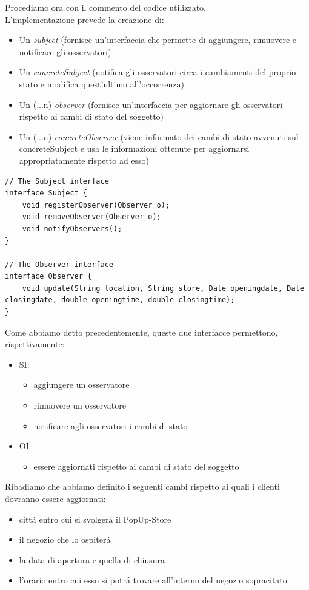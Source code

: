 \documentclass[12pt]{article}
\begin{document}
Procediamo ora con il commento del codice utilizzato. \\
L'implementazione prevede la creazione di:
\begin{itemize}
    \item Un \textit{subject} (fornisce un'interfaccia che permette di aggiungere, rimuovere e notificare gli osservatori)
    \item Un \textit{concreteSubject} (notifica gli osservatori circa i cambiamenti del proprio stato e modifica quest'ultimo all'occorrenza)
    \item Un (...n) \textit{observer} (fornisce un'interfaccia per aggiornare gli osservatori rispetto ai cambi di stato del soggetto)
    \item Un (...n) \textit{concreteObserver} (viene informato dei cambi di stato avvenuti sul concreteSubject e usa le informazioni ottenute per aggiornarsi appropriatamente rispetto ad esso)
\end{itemize}

\begin{lstlisting}
// The Subject interface 
interface Subject {
    void registerObserver(Observer o); 
    void removeObserver(Observer o); 
    void notifyObservers();
}

// The Observer interface 
interface Observer {
    void update(String location, String store, Date openingdate, Date closingdate, double openingtime, double closingtime); 
}
\end{lstlisting}

Come abbiamo detto precedentemente, queste due interfacce permettono, rispettivamente:
\begin{itemize}
    \item SI:
        \begin{itemize}
        \item aggiungere un osservatore 
        \item rimuovere un osservatore 
        \item notificare agli osservatori i cambi di stato
        \end{itemize}
    \item OI:
        \begin{itemize}
        \item essere aggiornati rispetto ai cambi di stato del soggetto
        \end{itemize}
\end{itemize}

Ribadiamo che abbiamo definito i seguenti cambi rispetto ai quali i clienti dovranno essere aggiornati:
\begin{itemize}
    \item citt\'a entro cui si svolger\'a il PopUp-Store 
    \item il negozio che lo ospiter\'a
    \item la data di apertura e quella di chiusura
    \item l'orario entro cui esso si potr\'a trovare all'interno del negozio sopracitato
\end{itemize}
\end{document}
